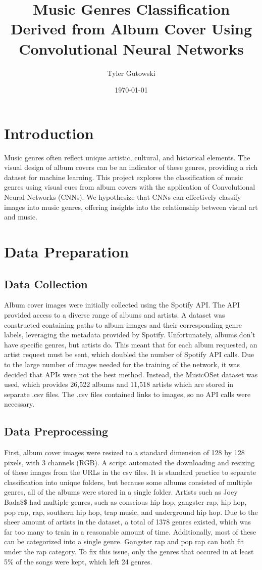 \documentclass[12pt]{article}
\title{Music Genres Classification Derived from Album Cover Using Convolutional Neural Networks}
\author{Tyler Gutowski}
\date{\today}
\begin{document}
\maketitle

\section{Introduction}
Music genres often reflect unique artistic, cultural, and historical elements. The visual design of album covers can be an indicator of these genres, providing a rich dataset for machine learning. This project explores the classification of music genres using visual cues from album covers with the application of Convolutional Neural Networks (CNNs). We hypothesize that CNNs can effectively classify images into music genres, offering insights into the relationship between visual art and music.

\section{Data Preparation}
\subsection{Data Collection}
Album cover images were initially collected using the Spotify API. The API provided access to a diverse range of albums and artists. A dataset was constructed containing paths to album images and their corresponding genre labels, leveraging the metadata provided by Spotify. Unfortunately, albums don't have specific genres, but artists do. This meant that for each album requested, an artist request must be sent, which doubled the number of Spotify API calls. Due to the large number of images needed for the training of the network, it was decided that APIs were not the best method. Instead, the MusicOSet dataset was used, which provides 26,522 albums and 11,518 artists which are stored in separate .csv files. The .csv files contained links to images, so no API calls were necessary.

\subsection{Data Preprocessing}
First, album cover images were resized to a standard dimension of 128 by 128 pixels, with 3 channels (RGB). A script automated the downloading and resizing of these images from the URLs in the csv files. It is standard practice to separate classification into unique folders, but because some albums consisted of multiple genres, all of the albums were stored in a single folder. Artists such as Joey Bada\$\$ had multiple genres, such as conscious hip hop, gangster rap, hip hop, pop rap, rap, southern hip hop, trap music, and underground hip hop. Due to the sheer amount of artists in the dataset, a total of 1378 genres existed, which was far too many to train in a reasonable amount of time. Additionally, most of these can be categorized into a single genre. Gangster rap and pop rap can both fit under the rap category. To fix this issue, only the genres that occured in at least 5\% of the songs were kept, which left 24 genres.
\end{document}
